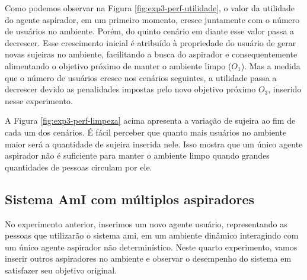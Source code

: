Como podemos observar na Figura \ref{fig:exp3-perf-utilidade}, o valor da utilidade do agente aspirador, em um primeiro momento, cresce juntamente com o número de usuários no ambiente. Porém, do quinto cenário em diante esse valor passa a decrescer. Esse crescimento inicial é atribuído à propriedade do usuário de gerar novas sujeiras no ambiente, facilitando a busca do aspirador e consequentemente alimentando o objetivo próximo de manter o ambiente limpo ($O_1$). Mas a medida que o número de usuários cresce nos cenários seguintes, a utilidade passa a decrescer devido as penalidades impostas pelo novo objetivo próximo $O_3$, inserido nesse experimento. 

\begin{figure}[h!]
    \centering
\end{figure}

A Figura \ref{fig:exp3-perf-limpeza} acima apresenta a variação de sujeira ao fim de cada um dos cenários.  É fácil perceber que quanto mais usuários no ambiente maior será a quantidade de sujeira inserida nele. Isso mostra que um único agente aspirador não é suficiente para manter o ambiente limpo quando grandes quantidades de pessoas circulam por ele.

\subsection{Sistema AmI com múltiplos aspiradores}
\label{sec:multi-asp}
No experimento anterior, inserimos um novo agente usuário, representando as pessoas que utilizarão o sistema \acrshort{ami}, em um ambiente dinâmico interagindo com um único agente aspirador não determinístico. Neste quarto experimento, vamos inserir outros aspiradores no ambiente e observar o desempenho do sistema em satisfazer seu objetivo original. 

